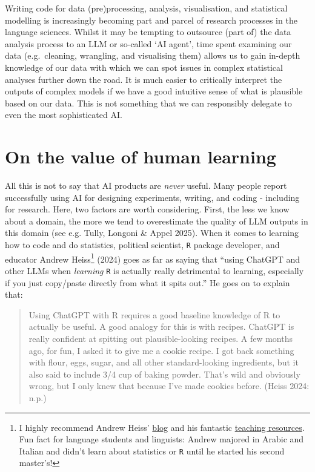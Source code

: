 \documentclass[
  letterpaper,
  DIV=11,
  numbers=noendperiod]{scrreprt}
\begin{document}
Writing code for data (pre)processing, analysis, visualisation, and
statistical modelling is increasingly becoming part and parcel of
research processes in the language sciences. Whilst it may be tempting
to outsource (part of) the data analysis process to an LLM or so-called
`AI agent', time spent examining our data (e.g.~cleaning, wrangling, and
visualising them) allows us to gain in-depth knowledge of our data with
which we can spot issues in complex statistical analyses further down
the road. It is much easier to critically interpret the outputs of
complex models if we have a good intuitive sense of what is plausible
based on our data. This is not something that we can responsibly
delegate to even the most sophisticated AI.

\section{On the value of human learning}\label{sec-HumanLearning}

All this is not to say that AI products are \emph{never} useful. Many
people report successfully using AI for designing experiments, writing,
and coding - including for research. Here, two factors are worth
considering. First, the less we know about a domain, the more we tend to
overestimate the quality of LLM outputs in this domain (see e.g. Tully,
Longoni \& Appel 2025). When it comes to learning how to code and do
statistics, political scientist, \texttt{R} package developer, and
educator Andrew Heiss\footnote{I highly recommend Andrew Heiss'
  \href{https://www.andrewheiss.com/blog/}{blog} and his fantastic
  \href{https://www.andrewheiss.com/teaching/}{teaching resources}. Fun
  fact for language students and linguists: Andrew majored in Arabic and
  Italian and didn't learn about statistics or \texttt{R} until he
  started his second master's!} (2024) goes as far as saying that
``using ChatGPT and other LLMs when \emph{learning} \texttt{R} is
actually really detrimental to learning, especially if you just
copy/paste directly from what it spits out.'' He goes on to explain
that:

\begin{quote}
Using ChatGPT with R requires a good baseline knowledge of R to actually
be useful. A good analogy for this is with recipes. ChatGPT is really
confident at spitting out plausible-looking recipes. A few months ago,
for fun, I asked it to give me a cookie recipe. I got back something
with flour, eggs, sugar, and all other standard-looking ingredients, but
it also said to include 3/4 cup of baking powder. That's wild and
obviously wrong, but I only knew that because I've made cookies before.
(Heiss 2024: n.p.)
\end{quote}
\end{document}
